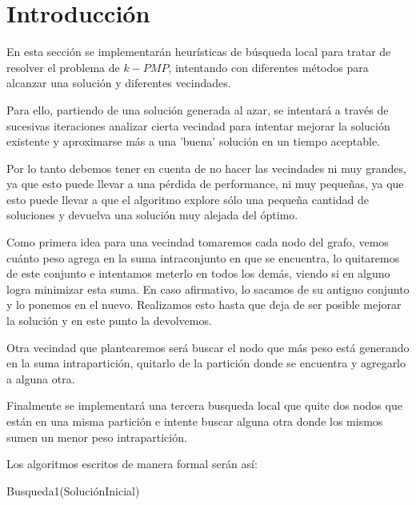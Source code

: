 \section{Introducci\'on}

En esta sección se implementarán heurísticas de búsqueda local para tratar de resolver el problema de $k-PMP$, intentando con diferentes métodos para alcanzar una solución y diferentes vecindades.

Para ello, partiendo de una solución generada al azar, se intentará a través de sucesivas iteraciones analizar cierta vecindad para intentar mejorar la solución existente y aproximarse más a una 'buena' solución en un tiempo aceptable. 

Por lo tanto debemos tener en cuenta de no hacer las vecindades ni muy grandes, ya que esto puede llevar a una pérdida de performance, ni muy pequeñas, ya que esto puede llevar a que el algoritmo explore sólo una pequeña cantidad de soluciones y devuelva una solución muy alejada del óptimo.

Como primera idea para una vecindad tomaremos cada nodo del grafo, vemos cuánto peso agrega en la suma intraconjunto en que se encuentra, lo quitaremos de este conjunto e intentamos meterlo en todos los demás, viendo si en alguno logra minimizar esta suma. En caso afirmativo, lo sacamos de su antiguo conjunto y lo ponemos en el nuevo. Realizamos esto hasta que deja de ser posible mejorar la solución y en este punto la devolvemos.


Otra vecindad que plantearemos será buscar el nodo que más peso está generando en la suma intrapartición, quitarlo de la partición donde se encuentra y agregarlo a alguna otra.

Finalmente se implementará una tercera busqueda local que quite dos nodos que están en una misma partición e intente buscar alguna otra donde los mismos sumen un menor peso intrapartición.

Los algoritmos escritos de manera formal serán así:

\begin{algorithm}
  	\begin{algorithmic}[1]\parskip=1mm
		 \caption{ Busqueda1(SoluciónInicial) }
	\end{algorithmic}
\end{algorithm}

